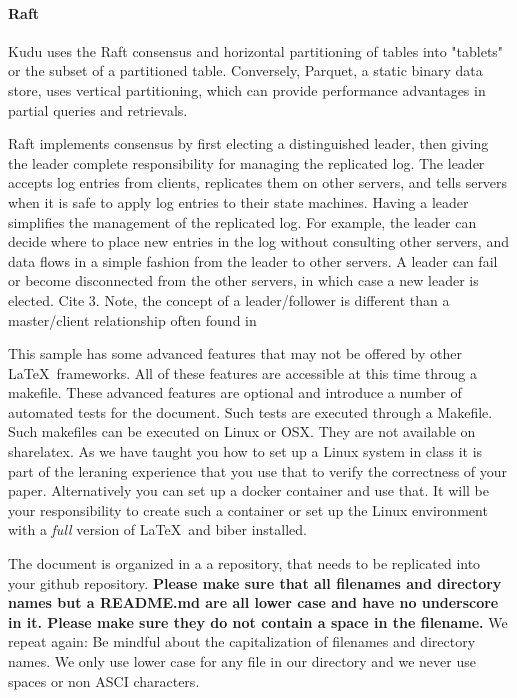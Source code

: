 \paragraph{Raft}
Kudu uses the Raft consensus and horizontal partitioning of tables into "tablets" or the subset of a partitioned table. Conversely, Parquet, a static binary data store, uses vertical partitioning, which can provide performance advantages in partial queries and retrievals. 

Raft implements consensus by first electing a distinguished leader, then giving the leader complete responsibility for managing the replicated log. The leader accepts log entries from clients, replicates them on other servers, and tells servers when it is safe to apply log entries to their state machines. Having a leader simplifies the management of the replicated log. For example, the leader can decide where to place new entries in the log without consulting other servers, and data flows in a simple fashion from the leader to other servers. A leader can fail or become disconnected from the other servers, in which case a new leader is elected.  Cite 3. Note, the concept of a leader/follower is different than a master/client relationship often found in 

This sample has some advanced features that may not be offered by
other \LaTeX\ frameworks. All of these features are accessible at this
time throug a makefile. These advanced features are optional and
introduce a number of automated tests for the document. Such tests are
executed through a Makefile. Such makefiles can be executed on Linux
or OSX. They are not available on sharelatex. As we have taught you
how to set up a Linux system in class it is part of the leraning
experience that you use that to verify the correctness of your
paper. Alternatively you can set up a docker container and use
that. It will be your responsibility to create such a container or set
up the Linux environment with a \textit{full} version of \LaTeX\ and biber
installed.

The document is organized in a a repository, that needs to be
replicated into your github repository. {\bf Please make sure that all
  filenames and directory names but a README.md are all lower case and
  have no underscore in it. Please make sure they do not contain a
  space in the filename.} We repeat again: Be mindful about the
capitalization of filenames and directory names. We only use lower
case for any file in our directory and we never use spaces or non ASCI
characters. 

